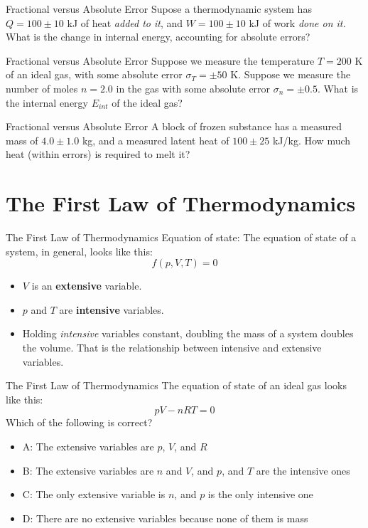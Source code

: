 \documentclass{beamer}
\begin{document}
\begin{frame}{Fractional versus Absolute Error}
Supose a thermodynamic system has $Q = 100\pm 10$ kJ of heat \textit{added to it}, and $W = 100\pm 10$ kJ of work \textit{done on it.}  What is the change in internal energy, accounting for absolute errors?
\end{frame}

\begin{frame}{Fractional versus Absolute Error}
Suppose we measure the temperature $T=200$ K of an ideal gas, with some absolute error $\sigma_T = \pm 50$ K.  Suppose we measure the number of moles $n=2.0$ in the gas with some absolute error $\sigma_n = \pm 0.5$.  What is the internal energy $E_{int}$ of the ideal gas?
\end{frame}

\begin{frame}{Fractional versus Absolute Error}
A block of frozen substance has a measured mass of $4.0\pm 1.0$ kg, and a measured latent heat of $100\pm 25$ kJ/kg.  How much heat (within errors) is required to melt it?
\end{frame}

\section{The First Law of Thermodynamics}

\begin{frame}{The First Law of Thermodynamics}
\alert{Equation of state}: The equation of state of a system, in general, looks like this:
\begin{equation}
f(p,V,T) = 0
\end{equation}
\begin{itemize}
\item $V$ is an \textbf{extensive} variable.
\item $p$ and $T$ are \textbf{intensive} variables.
\item Holding \textit{intensive} variables constant, doubling the mass of a system doubles the volume.  That is the relationship between intensive and extensive variables.
\end{itemize}
\end{frame}

\begin{frame}{The First Law of Thermodynamics}
\alert{The equation of state of an ideal gas} looks like this:
\begin{equation}
pV - nRT = 0
\end{equation}
Which of the following is correct?
\begin{itemize}
\item A: The extensive variables are $p$, $V$, and $R$
\item B: The extensive variables are $n$ and $V$, and $p$, and $T$ are the intensive ones
\item C: The only extensive variable is $n$, and $p$ is the only intensive one
\item D: There are no extensive variables because none of them is mass
\end{itemize}
\end{frame}
\end{document}
